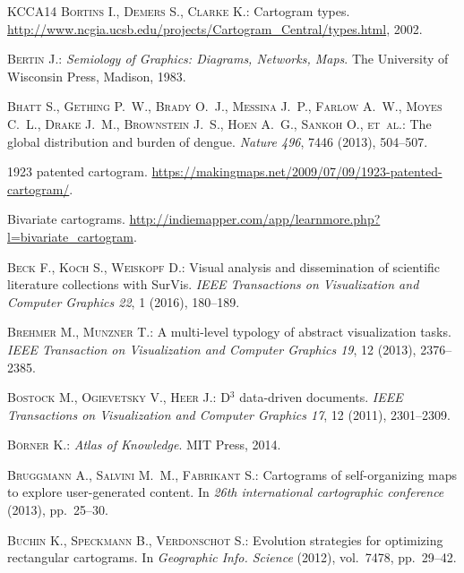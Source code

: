 \documentclass{egpubl}
\begin{document}
\begin{thebibliography}{\uppercase{KCCA{\etalchar{*}}14}}
\textsc{Bortins I., Demers S., Clarke K.}:
\newblock Cartogram types.
\newblock
  \url{http://www.ncgia.ucsb.edu/projects/Cartogram_Central/types.html}, 2002.

\textsc{Bertin J.}:
\newblock \emph{Semiology of Graphics: Diagrams, Networks, Maps}.
\newblock The University of Wisconsin Press, Madison, 1983.

\textsc{Bhatt S., Gething P.~W., Brady O.~J., Messina J.~P., Farlow A.~W.,
  Moyes C.~L., Drake J.~M., Brownstein J.~S., Hoen A.~G., Sankoh O., et~al.}:
\newblock The global distribution and burden of dengue.
\newblock \emph{Nature 496}, 7446 (2013), 504--507.

1923 patented cartogram.
\newblock \url{https://makingmaps.net/2009/07/09/1923-patented-cartogram/}.

Bivariate cartograms.
\newblock \url{http://indiemapper.com/app/learnmore.php?l=bivariate_cartogram}.

\textsc{Beck F., Koch S., Weiskopf D.}:
\newblock Visual analysis and dissemination of scientific literature
  collections with {S}ur{V}is.
\newblock \emph{IEEE Transactions on Visualization and Computer Graphics 22}, 1
  (2016), 180--189.

\textsc{Brehmer M., Munzner T.}:
\newblock A multi-level typology of abstract visualization tasks.
\newblock \emph{{IEEE} Transaction on Visualization and Computer Graphics 19},
  12 (2013), 2376--2385.

\textsc{Bostock M., Ogievetsky V., Heer J.}:
\newblock D$^3$ data-driven documents.
\newblock \emph{IEEE Transactions on Visualization and Computer Graphics 17},
  12 (2011), 2301--2309.

\textsc{B{\"o}rner K.}:
\newblock \emph{Atlas of Knowledge}.
\newblock MIT Press, 2014.

\textsc{Bruggmann A., Salvini M.~M., Fabrikant S.}:
\newblock Cartograms of self-organizing maps to explore user-generated content.
\newblock In \emph{26th international cartographic conference} (2013),
  pp.~25--30.

\textsc{Buchin K., Speckmann B., Verdonschot S.}:
\newblock Evolution strategies for optimizing rectangular cartograms.
\newblock In \emph{Geographic Info. Science} (2012), vol.~7478, pp.~29--42.


\end{thebibliography}
\end{document}

